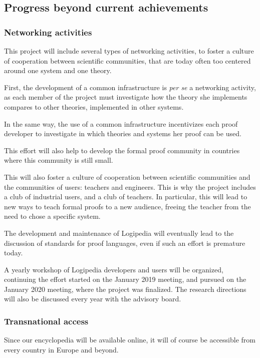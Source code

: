 \subsection{Progress beyond current achievements}

\subsubsection{Networking activities}
This project will include several types of networking activities, to
foster a culture of cooperation between scientific communities, that
are today often too centered around one system and one theory.

First, the development of a common infrastructure is {\em per se} a
networking activity, as each member of the project must investigate
how the theory she implements compares to other theories, implemented
in other systems.

In the same way, the use of a common infrastructure incentivizes each
proof developer to investigate in which theories and systems her proof
can be used.

This effort will also help to develop the formal proof community in
countries where this community is still small.

This will also foster a culture of cooperation between scientific
communities and the communities of users: teachers and engineers.
This is why the project includes a club of industrial users, and
a club of teachers. In particular, this will lead to new ways to teach
formal proofs to a new audience, freeing the teacher from the need to
chose a specific system.

The development and maintenance of {\sc Logipedia} will eventually lead
to the discussion of standards for proof languages, even if such an
effort is premature today.

A yearly workshop of {\sc Logipedia} developers and users will be
organized, continuing the effort started on the January 2019 meeting,
and pursued on the January 2020 meeting, where the project was
finalized. The research directions will also be discussed
every year with the advisory board.

\subsubsection{Transnational access}

Since our encyclopedia will be available online, it will of course be
accessible from every country in Europe and beyond.

